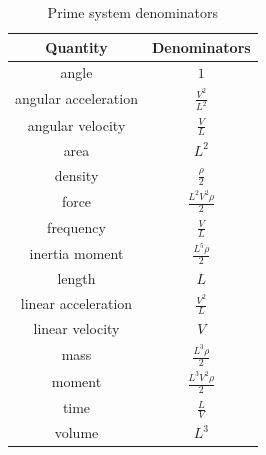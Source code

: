 \begin{table}[]
\caption{Prime system denominators}
\label{tab:prime-system-denominators}
\centering
\label{tab:my_label}
\begin{tabular}{|c|c|}
\hline
Quantity &
Denominators
\\
\hline

angle
&

\(1\)
\\


angular
acceleration
&

\(\frac{V^{2}}{L^{2}}\)
\\


angular
velocity
&

\(\frac{V}{L}\)
\\


area
&

\(L^{2}\)
\\


density
&

\(\frac{\rho}{2}\)
\\


force
&

\(\frac{L^{2} V^{2} \rho}{2}\)
\\


frequency
&

\(\frac{V}{L}\)
\\


inertia
moment
&

\(\frac{L^{5} \rho}{2}\)
\\


length
&

\(L\)
\\


linear
acceleration
&

\(\frac{V^{2}}{L}\)
\\


linear
velocity
&

\(V\)
\\


mass
&

\(\frac{L^{3} \rho}{2}\)
\\


moment
&

\(\frac{L^{3} V^{2} \rho}{2}\)
\\


time
&

\(\frac{L}{V}\)
\\


volume
&

\(L^{3}\)
\\
\hline

\end{tabular}


\end{table}

